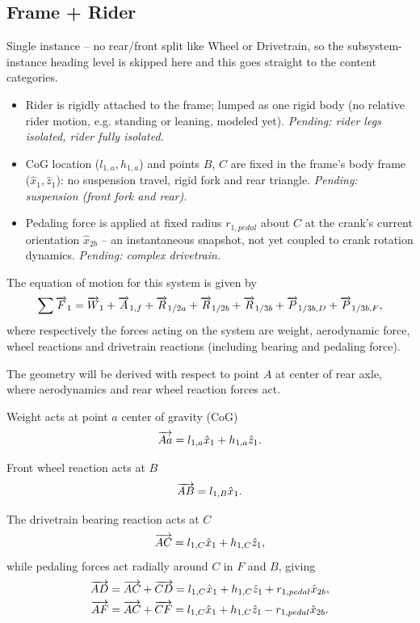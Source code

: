\subsection{Frame + Rider}
\label{sec:frame}
Single instance -- no rear/front split like Wheel or Drivetrain, so the subsystem-instance heading level is skipped here and this goes straight to the content categories.
\begin{itemize}
    \item Rider is rigidly attached to the frame; lumped as one rigid body (no relative rider motion, e.g. standing or leaning, modeled yet). \emph{Pending: rider legs isolated, rider fully isolated.}
    \item CoG location ($l_{1,a},h_{1,a}$) and points $B$, $C$ are fixed in the frame's body frame ($\hat x_1,\hat z_1$): no suspension travel, rigid fork and rear triangle. \emph{Pending: suspension (front fork and rear).}
    \item Pedaling force is applied at fixed radius $r_{1,pedal}$ about $C$ at the crank's current orientation $\hat x_{2b}$ -- an instantaneous snapshot, not yet coupled to crank rotation dynamics. \emph{Pending: complex drivetrain.}
\end{itemize}

The equation of motion for this system is given by
\begin{equation}
    \sum \overrightarrow{F}_1 = \overrightarrow{W}_1 + \overrightarrow{A}_{1,f} + \overrightarrow{R}_{1/2a} + \overrightarrow{R}_{1/2b} + \overrightarrow{R}_{1/3b} + \overrightarrow{P}_{1/3b, D} + \overrightarrow{P}_{1/3b, F},
\end{equation}
where respectively the forces acting on the system are weight, aerodynamic force, wheel reactions and drivetrain reactions (including bearing and pedaling force).

The geometry will be derived with respect to point $A$ at center of rear axle, where aerodynamics and rear wheel reaction forces act.

Weight acts at point $a$ center of gravity (CoG)
\begin{equation}
    \overrightarrow{Aa} = l_{1,a}\hat{x}_1 + h_{1,a}\hat{z}_1.
\end{equation}

Front wheel reaction acts at $B$
\begin{equation}
    \overrightarrow{AB} = l_{1,B}\hat{x}_1.
\end{equation}

The drivetrain bearing reaction acts at $C$
\begin{equation}
    \overrightarrow{AC} = l_{1,C}\hat{x}_1 + h_{1,C}\hat{z}_1,
\end{equation}
while pedaling forces act radially around $C$ in $F$ and $B$, giving
\begin{align}
    \overrightarrow{AD} &= \overrightarrow{AC} + \overrightarrow{CD} = l_{1,C}\hat{x}_1 + h_{1,C}\hat{z}_1 + r_{1,pedal} \hat{x}_{2b}, \\
    \overrightarrow{AF} &= \overrightarrow{AC} + \overrightarrow{CF} = l_{1,C}\hat{x}_1 + h_{1,C}\hat{z}_1 - r_{1,pedal} \hat{x}_{2b}.
\end{align}


